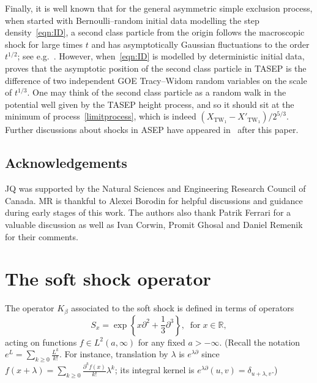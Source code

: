 \documentclass[AHL,Unicode,longabstracts]{cedram}
\DeclareMathOperator{\tw}{TW}
\newcommand{\R}{\mathbb{R}}
\begin{document}
Finally, it is well known that for the general asymmetric simple exclusion process, when started with Bernoulli--random initial data modelling the step density~\eqref{eqn:ID}, a second class particle from the origin follows the macroscopic shock for large times $t$ and has asymptotically Gaussian fluctuations to the order $t^{1/2}$; see e.g.~\cite{Lig}. However, when~\eqref{eqn:ID} is modelled by deterministic initial data, \cite{FGN} proves that the asymptotic position of the second class particle in TASEP is the difference of two independent GOE Tracy--Widom random variables on the scale of $t^{1/3}$. One may think of the second class particle as a random walk in the potential well given by the TASEP height process, and so it should sit at the minimum of process~\eqref{limitprocess}, which is indeed $(X_{\tw_1}- X'_{\tw_1})/2^{5/3}$. Further discussions about shocks in ASEP have appeared in~\cite{BB, N2} after this paper.

\subsection*{Acknowledgements}
JQ was supported by the Natural Sciences and Engineering Research Council of Canada. MR is thankful to Alexei Borodin for helpful discussions and guidance during early stages of this work. The authors also thank Patrik Ferrari for a valuable discussion as well as Ivan Corwin, Promit Ghosal and Daniel Remenik for their comments.

\section{The soft shock operator} \label{sec:softkernel}

The operator $K_{\beta}$ associated to the soft shock is defined in terms of operators
\begin{equation}\label{eqn:S}
S_x = \exp \left\{x \partial^2 + \frac{1}{3}\partial^3\right\}, \;\;\text{for}\; x \in \R,
\end{equation}
acting on functions $f \in L^2(a,\infty)$ for any fixed $a >-\infty$. (Recall the notation $e^L = \sum_{k \geq 0} \frac{L^k}{k!}$. For instance, translation by $\lambda$ is $e^{\lambda \partial}$ since $f(x + \lambda) = \sum_{k \geq 0} \frac{\partial^k f(x)}{k!} \lambda^k$; its integral kernel is $e^{\lambda \partial}(u,v) = \delta_{u+\lambda,v}$.)
\end{document}
